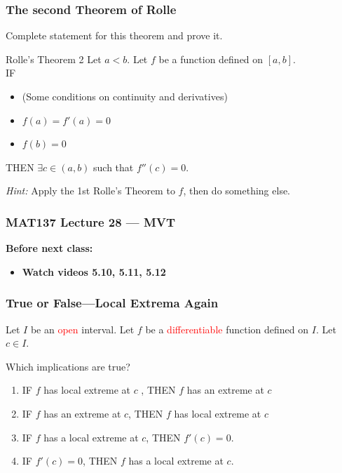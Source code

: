 \documentclass[14pt]{beamer}
\begin{document}
	\begin{frame}[t]
		\frametitle{The second Theorem of Rolle}

		Complete statement for this theorem and prove it.

		\vfill

		\begin{block}{Rolle's Theorem 2}
			Let $a<b$. Let $f$ be a function defined on $[a,b]$. \\ IF
			\begin{itemize}
				\item (Some conditions on continuity and derivatives)

				\item $\displaystyle f(a) = f'(a) =0$

				\item $\displaystyle f(b)=0$
			\end{itemize}
			THEN $\displaystyle \exists c \in (a,b)$ such that $\displaystyle f''(c)=0$.
		\end{block}

		\vfill

		\emph{Hint:} Apply the 1st Rolle's Theorem to $f$, then do something else.
	\end{frame}















\begin{frame}
	\frametitle{MAT137 Lecture 28 --- MVT}

	\vfill
	{\bf Before next class:}
		\begin{itemize} \normalsize
			\item {\bf Watch videos  5.10, 5.11, 5.12}
		\end{itemize}
\end{frame}

	\begin{frame}[t]
		\frametitle{True or False---Local Extrema Again}

		Let $I$ be an \textcolor{red}{open} interval. Let $f$ be a \textcolor{red}{differentiable}
		function defined on $I$. Let $c\in I$.

		Which implications are true?
		\begin{enumerate}
			\item IF $f$ has local extreme at $c$ , THEN $f$ has an extreme at $c$
			\item IF $f$ has an extreme at $c$, THEN $f$ has local extreme at $c$
			\item IF $f$ has a local extreme at $c$, THEN $f' (c ) = 0$.
			\item IF $f'(c ) = 0$, THEN $f$ has a local extreme at $c$.
		\end{enumerate}

	\end{frame}
\end{document}
